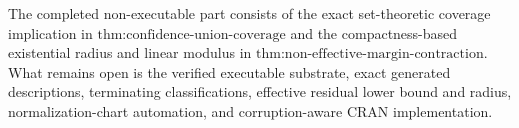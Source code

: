 The completed non-executable part consists of the exact set-theoretic coverage implication in \(\text{thm:confidence-union-coverage}\) and the compactness-based existential radius and linear modulus in \(\text{thm:non-effective-margin-contraction}\). What remains open is the verified executable substrate, exact generated descriptions, terminating classifications, effective residual lower bound and radius, normalization-chart automation, and corruption-aware CRAN implementation.